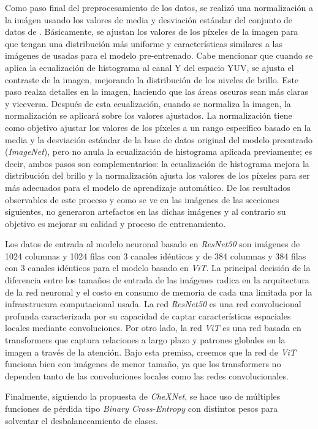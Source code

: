 Como paso final del preprocesamiento de los datos, se realizó una normalización a la imágen usando los valores de
media y desviación estándar del conjunto
de datos de . Básicamente, se ajustan los valores de los píxeles de la imagen para que tengan una
distribución más uniforme y características similares a las imágenes de usadas para el modelo pre-entrenado.
Cabe mencionar que cuando se aplica la ecualización de histograma al canal Y del espacio YUV, se ajusta el contraste de
la imagen, mejorando la distribución de los niveles de brillo. Este paso realza detalles en la imagen, haciendo que las
áreas oscuras sean más claras y viceversa. Después de esta ecualización, cuando se normaliza la imagen, la normalización
se aplicará sobre los valores ajustados. La normalización tiene como objetivo ajustar los valores de los píxeles a un
rango específico basado en la media y la desviación estándar de la base de datos original del modelo preentrado
(\textit{ImageNet}), pero no anula la ecualización de histograma aplicada previamente; es decir, ambos pasos son
complementarios: la ecualización de histograma mejora la distribución del brillo y la normalización ajusta los valores
de los píxeles para ser más adecuados para el modelo de aprendizaje automático. De los resultados observables de este
proceso y como se ve en las imágenes de las secciones siguientes, no generaron artefactos en las dichas imágenes y al
contrario su objetivo es mejorar su calidad y proceso de entrenamiento.

Los datos de entrada al modelo neuronal basado en \textit{ResNet50} son imágenes de 1024 columnas y 1024 filas con 3
canales idénticos y de 384 columnas y 384 filas con 3 canales idénticos para el modelo basado en \textit{ViT}.
La principal decisión de la diferencia entre los tamaños de entrada de las imágenes radica en la arquitectura de la red
neuronal y el costo en consumo de memoria de cada una limitada por la infraestrucura computacional usada.
La red \textit{ResNet50} es una red convolucional profunda caracterizada por su capacidad de captar características
espaciales locales mediante convoluciones. Por otro lado, la red \textit{ViT} es una red basada en transformers que
captura relaciones a largo plazo y patrones globales en la imagen a través de la atención. Bajo esta premisa, creemos
que la red de \textit{ViT} funciona bien con imágenes de menor tamaño, ya que los transformers no dependen tanto de las
convoluciones locales como las redes convolucionales.

Finalmente, siguiendo la propuesta de \textit{CheXNet}, se hace uso de múltiples funciones de pérdida tipo
\textit{Binary Cross-Entropy} con distintos pesos para solventar el desbalanceamiento de clases.


